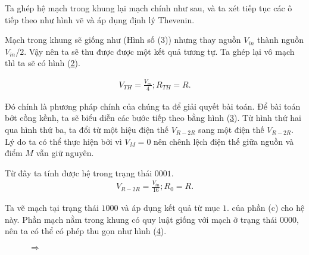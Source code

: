 \begin{center}
\begin{enumerate}[label=(\alph*)]
\begin{enumerate}
    Ta ghép hệ mạch trong khung lại mạch chính như sau, và ta xét tiếp tục các ô tiếp theo như hình vẽ và áp dụng định lý Thevenin.
    \begin{figure}[!h]
        \centering
        
        \caption{}
        \label{S3.Hình 4}
    \end{figure}

    Mạch trong khung sẽ giống như (Hình số (3)) nhưng thay nguồn $V_{in}$ thành nguồn $V_{in}/2$. Vậy nên ta sẽ thu được được một kết quả tương tự. Ta ghép lại vô mạch thì ta sẽ có hình (\ref{S3.Hình 5}).

    \begin{align}
        V_{TH}= \frac{V_{in}}{4} ; R_{TH}= R.
        \label{eq:70}
    \end{align}
    \begin{figure}[ht]
        \centering
        
        \caption{}
        \label{S3.Hình 5}
    \end{figure}

    Đó chính là phương pháp chính của chúng ta để giải quyết bài toán. Để bài toán bớt cồng kềnh, ta sẽ biểu diễn các bước tiếp theo bằng hình (\ref{S3.Hình 6}). Từ hình thứ hai qua hình thứ ba, ta đổi từ một hiệu điện thế $V_{R-2R}$ sang một điện thế $V_{R-2R}$. Lý do ta có thể thực hiện bởi vì $V_M=0$ nên chênh lệch điện thế giữa nguồn và điểm $M$ vẫn giữ nguyên.
    \begin{figure}[!h]
        \centering
        
        \caption{}
        \label{S3.Hình 6}
    \end{figure}

    Từ đây ta tính được hệ trong trạng thái $0001$.
    \begin{align}
        V_{R-2R}=\frac{V_{in}}{16} ; R_0 = R.
        \label{eq:71}
    \end{align}

    Ta vẽ mạch tại trạng thái $1000$ và áp dụng kết quả từ mục $1.$ của phần (c) cho hệ này. Phần mạch nằm trong khung có quy luật giống với mạch ở trạng thái $0000$, nên ta có thể có phép thu gọn như hình  (\ref{S3.Hình 7-Hình 8}).
    \begin{figure}[ht]
        \centering
        \begin{minipage}{0.53 \textwidth}
            
        \end{minipage}
        {\Large $\Rightarrow$}
        \begin{minipage}[c]{0.2 \textwidth}
            
        \end{minipage}
        \caption{}
        \label{S3.Hình 7-Hình 8}
    \end{figure}
   

\end{enumerate}
\end{enumerate}
\end{center}
